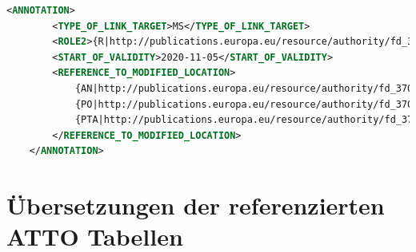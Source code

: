 \begin{lstlisting}[language=XML]
    <ANNOTATION>
        <TYPE_OF_LINK_TARGET>MS</TYPE_OF_LINK_TARGET>
        <ROLE2>{R|http://publications.europa.eu/resource/authority/fd_375/R}<ROLE2>
        <START_OF_VALIDITY>2020-11-05</START_OF_VALIDITY>
        <REFERENCE_TO_MODIFIED_LOCATION>
            {AN|http://publications.europa.eu/resource/authority/fd_370/AN} V
            {PO|http://publications.europa.eu/resource/authority/fd_370/PO} MET
            {PTA|http://publications.europa.eu/resource/authority/fd_370/PTA} (c) PT 1
        </REFERENCE_TO_MODIFIED_LOCATION>
    </ANNOTATION>
\end{lstlisting}



    \pagebreak
    \section{Übersetzungen der referenzierten ATTO Tabellen}
    
